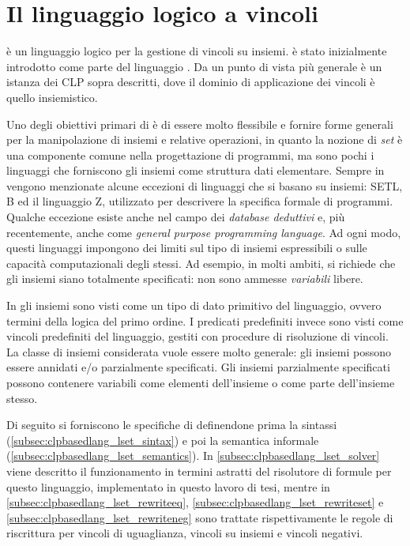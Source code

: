 \documentclass[12pt,a4paper,openright]{book} %
\begin{document}
\section{Il linguaggio logico a vincoli \lset{}}
\label{sec:clpbasedlang_lset}

\lset{} è un linguaggio logico per la gestione di vincoli su
insiemi. \lset{} è stato inizialmente introdotto come parte del
linguaggio \clpset{} \cite{Dovier00}. Da un punto di vista più
generale \clpset{} è un istanza dei CLP sopra descritti, dove il
dominio di applicazione dei vincoli è quello insiemistico.

Uno degli obiettivi primari di \clpset{} è di essere molto flessibile
e fornire forme generali per la manipolazione di insiemi e relative
operazioni, in quanto la nozione di \emph{set} è una componente comune
nella progettazione di programmi, ma sono pochi i linguaggi che
forniscono gli insiemi come struttura dati elementare.  Sempre in
\cite{Dovier00} vengono menzionate alcune eccezioni di linguaggi che
si basano su insiemi: SETL, B ed il linguaggio Z, utilizzato per
descrivere la specifica formale di programmi. Qualche eccezione esiste
anche nel campo dei \emph{database deduttivi} e, più recentemente,
anche come \emph{general purpose programming language}. Ad ogni modo,
questi linguaggi impongono dei limiti sul tipo di insiemi espressibili
o sulle capacità computazionali degli stessi. Ad esempio, in molti
ambiti, si richiede che gli insiemi siano totalmente specificati: non
sono ammesse \emph{variabili} libere.

In \lset{} gli insiemi sono visti come un tipo di dato primitivo del
linguaggio, ovvero termini della logica del primo ordine. I predicati
predefiniti invece sono visti come vincoli predefiniti del linguaggio,
gestiti con procedure di risoluzione di vincoli. La classe di insiemi
considerata vuole essere molto generale: gli insiemi possono essere
annidati e/o parzialmente specificati. Gli insiemi parzialmente
specificati possono contenere variabili come elementi dell’insieme o
come parte dell’insieme stesso.

Di seguito si forniscono le specifiche di \lset{} definendone prima la
sintassi (\ref{subsec:clpbasedlang_lset_sintax}) e poi la semantica
informale (\ref{subsec:clpbasedlang_lset_semantics}). In
\ref{subsec:clpbasedlang_lset_solver} viene descritto il funzionamento
in termini astratti del risolutore di formule per questo linguaggio,
implementato in questo lavoro di tesi, mentre in
\ref{subsec:clpbasedlang_lset_rewriteeq},
\ref{subsec:clpbasedlang_lset_rewriteset} e
\ref{subsec:clpbasedlang_lset_rewriteneg} sono trattate
rispettivamente le regole di riscrittura per vincoli di uguaglianza,
vincoli su insiemi e vincoli negativi.
\end{document}
